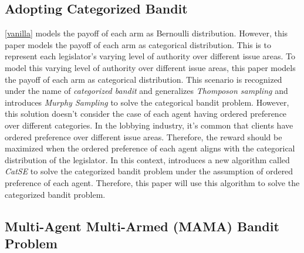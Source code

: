 \documentclass{article}
\begin{document}
\subsection{Adopting Categorized Bandit}
\ref{vanilla} models the payoff of each arm as Bernoulli distribution. However, this paper models the payoff of each arm as categorical distribution.
This is to represent each legislator's varying level of authority over different issue areas. 
To model this varying level of authority over different issue areas, this paper models the payoff of each arm as categorical distribution. This scenario is recognized under the name of \textit{categorized bandit} and 
\cite{catego} generalizes \textit{Thomposon sampling} \citep{tom} and introduces \textit{Murphy Sampling} to solve the categorical bandit problem. However, this solution doesn't consider the case of each agent having ordered preference over different categories.
In the lobbying industry, it's common that clients have ordered preference over different issue areas. Therefore, the reward should be maximized when the ordered preference of each agent aligns with the categorical distribution of the legislator.
In this context, \cite{NEURIPS2019_83462e22} introduces a new algorithm called \textit{CatSE}\label{cat} to solve the categorized bandit problem under the assumption of ordered preference of each agent. Therefore, this paper will use this algorithm to solve the categorized bandit problem.

\subsection{Multi-Agent Multi-Armed (MAMA) Bandit Problem}
\end{document}
